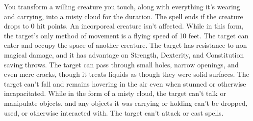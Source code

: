 \documentclass[letterpaper,openany,oneside,twocolumn]{book}
\begin{document}
You transform a willing creature you touch, along with everything it's wearing and carrying, into a misty cloud for the duration. The spell ends if the creature drops to 0 hit points. An incorporeal creature isn't affected.
While in this form, the target's only method of movement is a flying speed of 10 feet. The target can enter and occupy the space of another creature. The target has resistance to non-magical damage, and it has advantage on Strength, Dexterity, and Constitution saving throws. The target can pass through small holes, narrow openings, and even mere cracks, though it treats liquids as though they were solid surfaces. The target can't fall and remains hovering in the air even when stunned or otherwise incapacitated.
While in the form of a misty cloud, the target can't talk or manipulate objects, and any objects it was carrying or holding can't be dropped, used, or otherwise interacted with. The target can't attack or cast spells.
\end{document}
